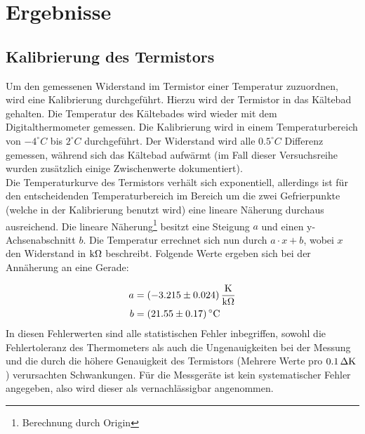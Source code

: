\section{Ergebnisse}

\subsection{Kalibrierung des Termistors}
Um den gemessenen Widerstand im Termistor einer Temperatur zuzuordnen, wird eine Kalibrierung durchgeführt. Hierzu wird der Termistor in das Kältebad gehalten. Die Temperatur des Kältebades wird wieder mit dem Digitalthermometer gemessen. Die Kalibrierung wird in einem Temperaturbereich von $-4^\circ C$ bis $2^\circ C$ durchgeführt. Der Widerstand wird alle $0.5^\circ C$ Differenz gemessen, während sich das Kältebad aufwärmt (im Fall dieser Versuchsreihe wurden zusätzlich einige Zwischenwerte dokumentiert).\\
Die Temperaturkurve des Termistors verhält sich exponentiell, allerdings ist für den entscheidenden Temperaturbereich im Bereich um die zwei Gefrierpunkte (welche in der Kalibrierung benutzt wird) eine lineare Näherung durchaus ausreichend. Die lineare Näherung\footnote{Berechnung durch Origin} besitzt eine Steigung $a$ und einen y-Achsenabschnitt $b$. Die Temperatur errechnet sich nun durch $a \cdot x + b$, wobei $x$ den Widerstand in $\unit[]{k\Omega}$ beschreibt. Folgende Werte ergeben sich bei der Annäherung an eine Gerade:

\begin{align*}
a &= \unit[(-3.215 \pm 0.024)]{\frac{K}{k\Omega}}\\
b &= \unit[(21.55 \pm 0.17)]{^\circ C}
\end{align*}
%
In diesen Fehlerwerten sind alle statistischen Fehler inbegriffen, sowohl die Fehlertoleranz des Thermometers als auch die Ungenauigkeiten bei der Messung und die durch die höhere Genauigkeit des Termistors (Mehrere Werte pro $\unit[0.1]{\Delta K}$) verursachten Schwankungen. Für die Messgeräte ist kein systematischer Fehler angegeben, also wird dieser als vernachlässigbar angenommen.


